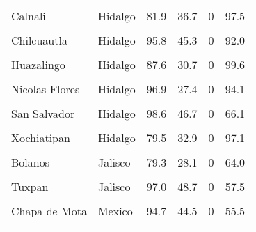 \documentclass[
]{report}
\begin{document}
\begin{longtable}[t]{llrrrr}
Calnali & Hidalgo & 81.9 & 36.7 & 0 & 97.5\\
\cellcolor{gray!6}{Cardonal} & \cellcolor{gray!6}{Hidalgo} & \cellcolor{gray!6}{96.1} & \cellcolor{gray!6}{35.7} & \cellcolor{gray!6}{0} & \cellcolor{gray!6}{96.5}\\
Chilcuautla & Hidalgo & 95.8 & 45.3 & 0 & 92.0\\
\addlinespace
\cellcolor{gray!6}{Huautla} & \cellcolor{gray!6}{Hidalgo} & \cellcolor{gray!6}{95.7} & \cellcolor{gray!6}{36.5} & \cellcolor{gray!6}{0} & \cellcolor{gray!6}{90.9}\\
Huazalingo & Hidalgo & 87.6 & 30.7 & 0 & 99.6\\
\cellcolor{gray!6}{Jaltocan} & \cellcolor{gray!6}{Hidalgo} & \cellcolor{gray!6}{79.9} & \cellcolor{gray!6}{41.2} & \cellcolor{gray!6}{0} & \cellcolor{gray!6}{98.3}\\
Nicolas Flores & Hidalgo & 96.9 & 27.4 & 0 & 94.1\\
\cellcolor{gray!6}{San Felipe Orizatlan} & \cellcolor{gray!6}{Hidalgo} & \cellcolor{gray!6}{83.3} & \cellcolor{gray!6}{36.6} & \cellcolor{gray!6}{0} & \cellcolor{gray!6}{87.8}\\
\addlinespace
San Salvador & Hidalgo & 98.6 & 46.7 & 0 & 66.1\\
\cellcolor{gray!6}{Tianguistengo} & \cellcolor{gray!6}{Hidalgo} & \cellcolor{gray!6}{82.5} & \cellcolor{gray!6}{27.9} & \cellcolor{gray!6}{0} & \cellcolor{gray!6}{63.2}\\
Xochiatipan & Hidalgo & 79.5 & 32.9 & 0 & 97.1\\
\cellcolor{gray!6}{Yahualica} & \cellcolor{gray!6}{Hidalgo} & \cellcolor{gray!6}{81.1} & \cellcolor{gray!6}{31.9} & \cellcolor{gray!6}{0} & \cellcolor{gray!6}{90.3}\\
Bolanos & Jalisco & 79.3 & 28.1 & 0 & 64.0\\
\addlinespace
\cellcolor{gray!6}{Cuautitlan de Garcia Barragan} & \cellcolor{gray!6}{Jalisco} & \cellcolor{gray!6}{90.6} & \cellcolor{gray!6}{31.9} & \cellcolor{gray!6}{0} & \cellcolor{gray!6}{69.2}\\
Tuxpan & Jalisco & 97.0 & 48.7 & 0 & 57.5\\
\cellcolor{gray!6}{Zapotitlan de Vadillo} & \cellcolor{gray!6}{Jalisco} & \cellcolor{gray!6}{98.1} & \cellcolor{gray!6}{44.6} & \cellcolor{gray!6}{0} & \cellcolor{gray!6}{84.7}\\
Chapa de Mota & Mexico & 94.7 & 44.5 & 0 & 55.5\\
\cellcolor{gray!6}{Morelos} & \cellcolor{gray!6}{Mexico} & \cellcolor{gray!6}{95.6} & \cellcolor{gray!6}{41.0} & \cellcolor{gray!6}{0} & \cellcolor{gray!6}{76.8}\\

\end{longtable}
\end{document}
